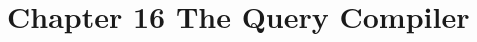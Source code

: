 \documentclass[../../main.tex]{subfiles}
\begin{document}
\section{Chapter 16 The Query Compiler}




\end{document}
